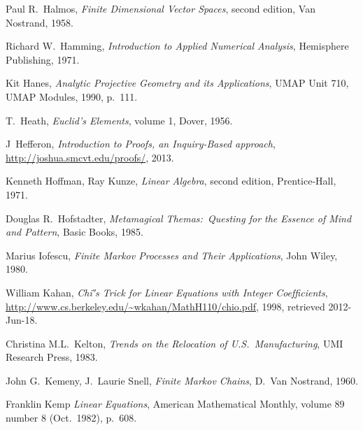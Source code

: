 \begin{thebibliography}{\makebox[2em][c]{{}\hfil{}}}
  Paul R.~Halmos,
  \emph{Finite Dimensional Vector Spaces},
  second edition,
  Van Nostrand,
  1958.


  Richard W.\ Hamming,
  \emph{Introduction to Applied Numerical Analysis},
  Hemisphere Publishing,
  1971.

  Kit Hanes,
  \emph{Analytic Projective Geometry and its Applications},
  UMAP Unit 710,
  UMAP Modules, 1990,
  p.~111.

  T.\ Heath,
  \emph{Euclid's Elements},
  volume 1,
  Dover,
  1956.

  J~Hef{}feron,
  \emph{Introduction to Proofs, an Inquiry-Based approach},
  \url{http://joshua.smcvt.edu/proofs/},
  2013.

  Kenneth Hoffman, Ray Kunze,
  \emph{Linear Algebra},
  second edition,
  Prentice-Hall,
  1971.

 Douglas R.~Hofstadter,
 \emph{Metamagical Themas:~Questing for the Essence of Mind and Pattern},
 Basic Books,
 1985.

  Marius Iofescu,
  \emph{Finite Markov Processes and Their Applications},
  John Wiley, 1980.

  William Kahan,
  \emph{Chi\`’s Trick  for  Linear Equations  with  Integer Coefﬁcients},
  \url{http://www.cs.berkeley.edu/~wkahan/MathH110/chio.pdf}, 1998,
  retrieved 2012-Jun-18.

  Christina M.L.~Kelton,
  \emph{Trends on the Relocation of U.S.\ Manufacturing},
  UMI Research Press, 1983.

  John G.~Kemeny, J.~Laurie Snell,
  \emph{Finite Markov Chains},
  D.~Van Nostrand, 1960.

  Franklin Kemp
  \emph{Linear Equations},
  American Mathematical Monthly,
  volume 89 number 8 (Oct.\ 1982),
  p.~608.




\end{thebibliography}
